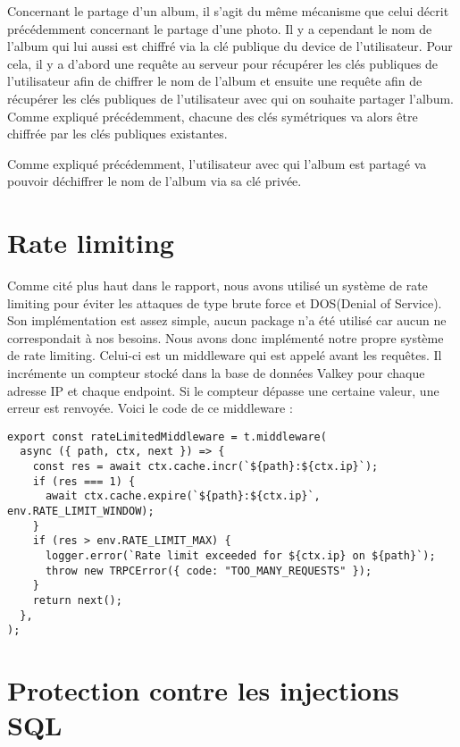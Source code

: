 \documentclass[
  11pt,
  paper=a4,
  ,captions=tableheading
]{scrartcl}
\begin{document}
Concernant le partage d’un album, il s’agit du même mécanisme que celui
décrit précédemment concernant le partage d’une photo. Il y a cependant
le nom de l’album qui lui aussi est chiffré via la clé publique du
device de l’utilisateur. Pour cela, il y a d’abord une requête au
serveur pour récupérer les clés publiques de l’utilisateur afin de
chiffrer le nom de l’album et ensuite une requête afin de récupérer les
clés publiques de l’utilisateur avec qui on souhaite partager l’album.
Comme expliqué précédemment, chacune des clés symétriques va alors être
chiffrée par les clés publiques existantes.

Comme expliqué précédemment, l’utilisateur avec qui l’album est partagé
va pouvoir déchiffrer le nom de l’album via sa clé privée.

\hypertarget{rate-limiting}{%
\section{Rate limiting}\label{rate-limiting}}

Comme cité plus haut dans le rapport, nous avons utilisé un système de
rate limiting pour éviter les attaques de type brute force et DOS(Denial
of Service). Son implémentation est assez simple, aucun package n’a été
utilisé car aucun ne correspondait à nos besoins. Nous avons donc
implémenté notre propre système de rate limiting. Celui-ci est un
middleware qui est appelé avant les requêtes. Il incrémente un compteur
stocké dans la base de données Valkey pour chaque adresse IP et chaque
endpoint. Si le compteur dépasse une certaine valeur, une erreur est
renvoyée. Voici le code de ce middleware :

\begin{verbatim}
export const rateLimitedMiddleware = t.middleware(
  async ({ path, ctx, next }) => {
    const res = await ctx.cache.incr(`${path}:${ctx.ip}`);
    if (res === 1) {
      await ctx.cache.expire(`${path}:${ctx.ip}`, env.RATE_LIMIT_WINDOW);
    }
    if (res > env.RATE_LIMIT_MAX) {
      logger.error(`Rate limit exceeded for ${ctx.ip} on ${path}`);
      throw new TRPCError({ code: "TOO_MANY_REQUESTS" });
    }
    return next();
  },
);
\end{verbatim}

\hypertarget{protection-contre-les-injections-sql}{%
\section{Protection contre les injections
SQL}\label{protection-contre-les-injections-sql}}
\end{document}
